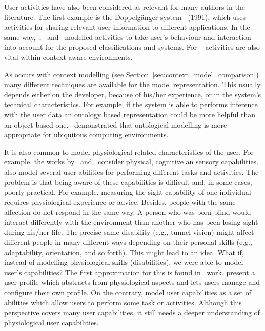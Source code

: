 User activities have also been considered as relevant for many authors in the 
literature. The first example is the Doppelgänger 
system~\citep{orwant_doppelgangeruser_1991} (1991), which uses activities for 
sharing relevant user information to different applications. In the same 
way,~\citet{persad_characterising_2007},~\citet{heckmann_gumogeneral_2005}
and~\citet{skillen2012ontological} modelled activities to take user's behaviour
and interaction into account for the proposed classifications and systems. For
~\citet{hatala_ontology_based_2005} activities are also vital within 
context-aware environments.

As occurs with context modelling (see Section~\ref{sec:context_model_comparison})
many different techniques are available for the model representation. This usually
depends either on the developer, because of his/her experience, or in the system's
technical characteristics. For example, if the system is able to performs inference
with the user data an ontology based representation could be more helpful than
an object based one.~\citet{strang_context_2004} demonstrated that ontological
modelling is more appropriate for ubiquitous computing environments.

It is also common to model physiological related characteristics of the user.
For example, the works by~\citet{gregor_designing_2002} 
and~\citet{persad_characterising_2007} consider physical, cognitive an sensory 
capabilities.~\citet{skillen2012ontological} also model several user abilities 
for performing different tasks and activities. The problem is that being aware 
of these capabilities is difficult and, in some cases, poorly practical. For 
example, measuring the sight capability of one individual requires physiological 
experience or advice. Besides, people with the same affection do not respond in 
the same way. A person who was born blind would interact differently with the 
environment than another who has been losing sight during his/her life. The 
precise same disability (e.g., tunnel vision) might affect different people 
in many different ways depending on their personal skills (e.g., adaptability,
orientation, and so forth). This might lead to an idea. What if, instead of 
modelling physiological skills (disabilities), we were able to model user's 
capabilities? The first approximation for this is found 
in~\citet{casas_user_2008} work. \citeauthor{casas_user_2008} present a user 
profile which abstracts from physiological aspects and lets users manage and 
configure their own profile. On the contrary, \citet{skillen2012ontological} 
model user capabilities as a set of abilities which allow users to perform some 
task or activities. Although this perspective covers many user capabilities, it
still needs a deeper understanding of physiological user capabilities.

